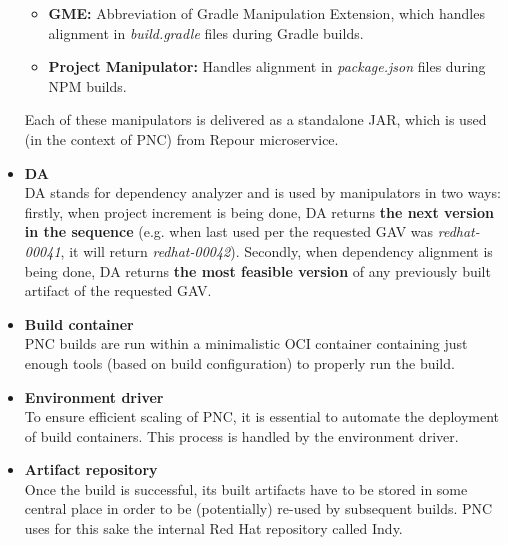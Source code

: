 \documentclass[../main.tex]{subfiles}
\begin{document}
\begin{itemize}
\begin{itemize}
        \item \textbf{GME:} Abbreviation of Gradle Manipulation Extension, which handles alignment in \textit{build.gradle} files during Gradle builds.

        \item \textbf{Project Manipulator:} Handles alignment in \textit{package.json} files during NPM builds.
    \end{itemize}

    Each of these manipulators is delivered as a standalone JAR, which is used (in the context of PNC) from Repour microservice.

    \item \textbf{DA}\\
    DA stands for dependency analyzer and is used by manipulators in two ways: firstly, when project increment is being done, DA returns \textbf{the next version in the sequence} (e.g. when last used per the requested GAV was \textit{redhat-00041}, it will return \textit{redhat-00042}). Secondly, when dependency alignment is being done, DA returns \textbf{the most feasible version} of any previously built artifact of the requested GAV.

    \item \textbf{Build container}\\
    PNC builds are run within a minimalistic OCI container containing just enough tools (based on build configuration) to properly run the build.

    \item \textbf{Environment driver}\\
    To ensure efficient scaling of PNC, it is essential to automate the deployment of build containers. This process is handled by the environment driver.

    \item \textbf{Artifact repository}\\
    Once the build is successful, its built artifacts have to be stored in some central place in order to be (potentially) re-used by subsequent builds. PNC uses for this sake the internal Red Hat repository called Indy.

\end{itemize}
\end{document}
